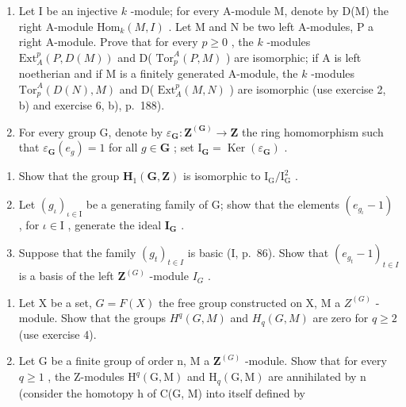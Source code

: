 \begin{enumerate}
\def\labelenumi{\arabic{enumi})}
\setcounter{enumi}{2}
\item
  Let I be an injective \(k\) -module; for every A-module M, denote by D(M) the right A-module \(\mathrm{Hom}_{k}(M, I)\) . Let M and N be two left A-modules, P a right A-module. Prove that for every \(p \geqslant 0\) , the \(k\) -modules \(\mathrm{Ext}_{A}^{p}(P, D(M))\) and D( \(\mathrm{Tor}_{p}^{A}(P, M)\) ) are isomorphic; if A is left noetherian and if M is a finitely generated A-module, the \(k\) -modules \(\mathrm{Tor}_{p}^{A}(D(N), M)\) and D( \(\mathrm{Ext}_{A}^{p}(M, N)\) ) are isomorphic (use exercise 2, b) and exercise 6, b), p.~188).
\item
  For every group G, denote by \(\varepsilon_{\mathbf{G}}: \mathbf{Z}^{(\mathbf{G})} \to \mathbf{Z}\) the ring homomorphism such that \(\varepsilon_{\mathbf{G}}(e_g) = 1\) for all \(g \in \mathbf{G}\) ; set \(\mathrm{I}_{\mathbf{G}} = \operatorname{Ker}(\varepsilon_{\mathbf{G}})\) .
\end{enumerate}

\begin{enumerate}
\def\labelenumi{\alph{enumi})}
\item
  Show that the group \(\mathbf{H}_{1}(\mathbf{G},\mathbf{Z})\) is isomorphic to \(\mathrm{I}_{\mathrm{G}} / \mathrm{I}_{\mathrm{G}}^{2}\) .
\item
  Let \((g_{\iota})_{\iota \in \mathrm{I}}\) be a generating family of G; show that the elements \((e_{g_{\iota}} - 1)\) , for \(\iota \in \mathrm{I}\) , generate the ideal \(\mathbf{I}_{\mathbf{G}}\) .
\item
  Suppose that the family \((g_{t})_{t\in I}\) is basic (I, p.~86). Show that \((e_{g_t} - 1)_{t\in I}\) is a basis of the left \(\mathbf{Z}^{(G)}\) -module \(I_G\) .
\end{enumerate}

\begin{enumerate}
\def\labelenumi{\arabic{enumi})}
\setcounter{enumi}{4}
\item
  Let X be a set, \(G = F(X)\) the free group constructed on X, M a \(Z^{(G)}\) -module. Show that the groups \(H^q(G, M)\) and \(H_q(G, M)\) are zero for \(q \geqslant 2\) (use exercise 4).
\item
  Let G be a finite group of order n, M a \(\mathbf{Z}^{(G)}\) -module. Show that for every \(q \geqslant 1\) , the Z-modules \(\mathrm{H}^{q}(\mathrm{G}, \mathrm{M})\) and \(\mathrm{H}_{q}(\mathrm{G}, \mathrm{M})\) are annihilated by n (consider the homotopy h of C(G, M) into itself defined by
\end{enumerate}

